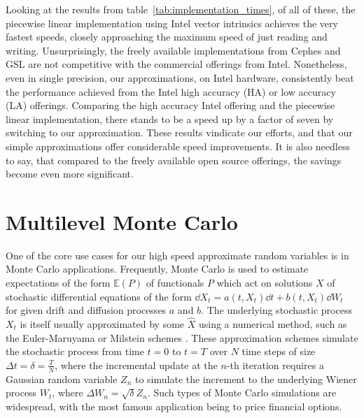 \documentclass[manuscript,review]{acmart}
\begin{document}
Looking at the results from table~\ref{tab:implementation_times}, of all of these, the piecewise linear implementation using Intel vector intrinsics achieves the very fastest speeds, closely approaching the maximum speed of just reading and writing. Unsurprisingly, the freely available implementations from Cephes and GSL are not competitive with the commercial offerings from Intel. Nonetheless, even in single precision, our approximations, on Intel hardware, consistently beat the performance achieved from the Intel high accuracy (HA) or low accuracy (LA) offerings. Comparing the high accuracy Intel offering and the piecewise linear implementation, there stands to be a speed up by a factor of seven by switching to our approximation. These results vindicate our efforts, and that our simple approximations offer considerable speed improvements. It is also needless to say, that compared to the freely available open source offerings, the savings become even more significant. 

\section{Multilevel Monte Carlo}
\label{sec:multilevel_monte_carlo}

One of the core use cases for our high speed approximate random variables is in Monte Carlo applications. Frequently, Monte Carlo is used to estimate expectations of the form $ \mathbb{E}(P) $ of functionals $ P $ which act on solutions $ X $ of stochastic differential equations of the form $ \dd{X_t} = a(t, X_t) \dd{t} + b(t, X_t)\dd{W_t} $ for given drift and diffusion processes $ a $ and $ b $. The underlying stochastic process $ X_t $ is itself usually approximated by some $ \widehat{X} $ using a numerical method, such as the Euler-Maruyama or Milstein schemes \citep{asmussen2007stochastic,kloeden1999numerical,lord2014introduction}. These approximation schemes simulate the stochastic process from time $ t = 0 $ to $ t = T $ over $ N $ time steps of size $ \Delta t = \delta = \tfrac{T}{N} $, where the incremental update at the $ n $-th iteration requires a Gaussian random variable $ Z_n $ to simulate the increment to the underlying Wiener process $ W_t $, where $ \Delta W_n = \sqrt{\delta}Z_n $. Such types of Monte Carlo simulations are widespread, with the most famous application being to price financial options. 
\end{document}
